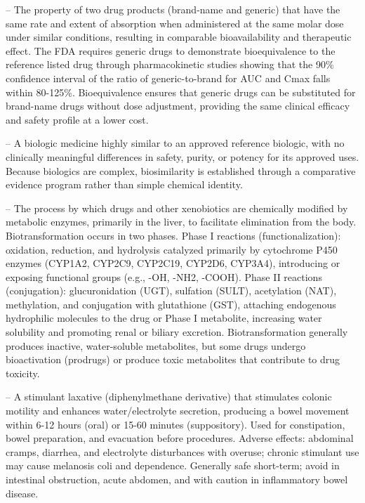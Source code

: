-- The property of two drug products (brand-name and generic) that have the same rate and extent of absorption when administered at the same molar dose under similar conditions, resulting in comparable bioavailability and therapeutic effect. The FDA requires generic drugs to demonstrate bioequivalence to the reference listed drug through pharmacokinetic studies showing that the 90\% confidence interval of the ratio of generic-to-brand for AUC and Cmax falls within 80-125\%. Bioequivalence ensures that generic drugs can be substituted for brand-name drugs without dose adjustment, providing the same clinical efficacy and safety profile at a lower cost.

-- A biologic medicine highly similar to an approved reference biologic, with no clinically meaningful differences in safety, purity, or potency for its approved uses. Because biologics are complex, biosimilarity is established through a comparative evidence program rather than simple chemical identity.

-- The process by which drugs and other xenobiotics are chemically modified by metabolic enzymes, primarily in the liver, to facilitate elimination from the body. Biotransformation occurs in two phases. Phase I reactions (functionalization): oxidation, reduction, and hydrolysis catalyzed primarily by cytochrome P450 enzymes (CYP1A2, CYP2C9, CYP2C19, CYP2D6, CYP3A4), introducing or exposing functional groups (e.g., -OH, -NH2, -COOH). Phase II reactions (conjugation): glucuronidation (UGT), sulfation (SULT), acetylation (NAT), methylation, and conjugation with glutathione (GST), attaching endogenous hydrophilic molecules to the drug or Phase I metabolite, increasing water solubility and promoting renal or biliary excretion. Biotransformation generally produces inactive, water-soluble metabolites, but some drugs undergo bioactivation (prodrugs) or produce toxic metabolites that contribute to drug toxicity.

-- A stimulant laxative (diphenylmethane derivative) that stimulates colonic motility and enhances water/electrolyte secretion, producing a bowel movement within 6-12 hours (oral) or 15-60 minutes (suppository). Used for constipation, bowel preparation, and evacuation before procedures. Adverse effects: abdominal cramps, diarrhea, and electrolyte disturbances with overuse; chronic stimulant use may cause melanosis coli and dependence. Generally safe short-term; avoid in intestinal obstruction, acute abdomen, and with caution in inflammatory bowel disease.

